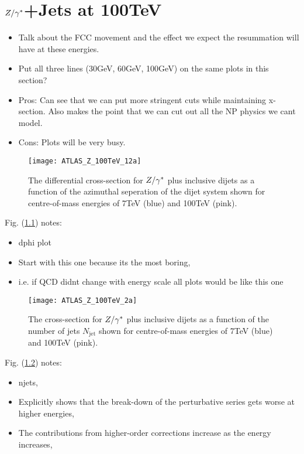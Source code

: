 \chapter{$Z/\gamma^*$+Jets at 100TeV}
\label{chap:100TeV}

	\begin{itemize}
		\item Talk about the FCC movement and the effect we expect the resummation will have at these energies.
		\item Put all three lines (30GeV, 60GeV, 100GeV) on the same plots in this section?
		\item Pros: Can see that we can put more stringent cuts while maintaining x-section.  Also
		      makes the point that we can cut out all the NP physics we cant model.
		\item Cons: Plots will be very busy.
	\end{itemize}

	\begin{figure}[h]
		\centering
		\texttt{[image: ATLAS\_Z\_100TeV\_12a]}
		\caption{The differential cross-section for $Z/\gamma^*$ plus inclusive dijets as a function of the azimuthal seperation of the dijet system shown for
		         centre-of-mass energies of 7TeV (blue) and 100TeV (pink).}
		\label{fig:100tev_12a}
	\end{figure}

	Fig. (\ref{fig:100tev_12a}) notes:

	\begin{itemize}
		\item dphi plot
		\item Start with this one because its the most boring,
		\item i.e. if QCD didnt change with energy scale all plots would be like this one
	\end{itemize}

	\begin{figure}[h]
		\centering
		\texttt{[image: ATLAS\_Z\_100TeV\_2a]}
		\caption{The cross-section for $Z/\gamma^*$ plus inclusive dijets as a function of the number of jets $N_{\text{jet}}$ shown for
		         centre-of-mass energies of 7TeV (blue) and 100TeV (pink).}
		\label{fig:100tev_2a}
	\end{figure}

	Fig. (\ref{fig:100tev_2a}) notes:

	\begin{itemize}
		\item njets,
		\item Explicitly shows that the break-down of the perturbative series gets worse at higher energies,
		\item The contributions from higher-order corrections increase as the energy increases,
	\end{itemize}

